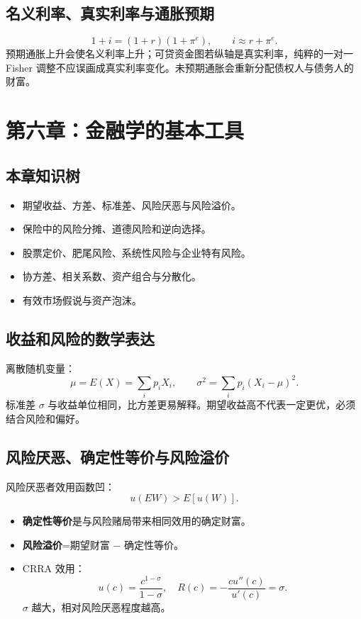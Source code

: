 \documentclass[UTF8,11pt,a4paper]{ctexart}
\newcommand{\term}[1]{\textbf{#1}}
\begin{document}
\subsection{名义利率、真实利率与通胀预期}
\[
1+i=(1+r)(1+\pi^e),
\qquad i\approx r+\pi^e.
\]
预期通胀上升会使名义利率上升；可贷资金图若纵轴是真实利率，纯粹的一对一 Fisher 调整不应误画成真实利率变化。未预期通胀会重新分配债权人与债务人的财富。

\newpage
\section{第六章：金融学的基本工具}

\subsection{本章知识树}
\begin{itemize}
  \item 期望收益、方差、标准差、风险厌恶与风险溢价。
  \item 保险中的风险分摊、道德风险和逆向选择。
  \item 股票定价、肥尾风险、系统性风险与企业特有风险。
  \item 协方差、相关系数、资产组合与分散化。
  \item 有效市场假说与资产泡沫。
\end{itemize}

\subsection{收益和风险的数学表达}
离散随机变量：
\[
\mu=E(X)=\sum_i p_iX_i,
\qquad
\sigma^2=\sum_i p_i(X_i-\mu)^2.
\]
标准差 $\sigma$ 与收益单位相同，比方差更易解释。期望收益高不代表一定更优，必须结合风险和偏好。

\subsection{风险厌恶、确定性等价与风险溢价}
风险厌恶者效用函数凹：
\[
u(EW)>E[u(W)].
\]
\begin{itemize}
  \item \term{确定性等价}是与风险赌局带来相同效用的确定财富。
  \item \term{风险溢价}=期望财富 $-$ 确定性等价。
  \item CRRA 效用：
  \[
  u(c)=\frac{c^{1-\sigma}}{1-\sigma},
  \quad R(c)=-\frac{cu''(c)}{u'(c)}=\sigma.
  \]
  $\sigma$ 越大，相对风险厌恶程度越高。
\end{itemize}
\end{document}
